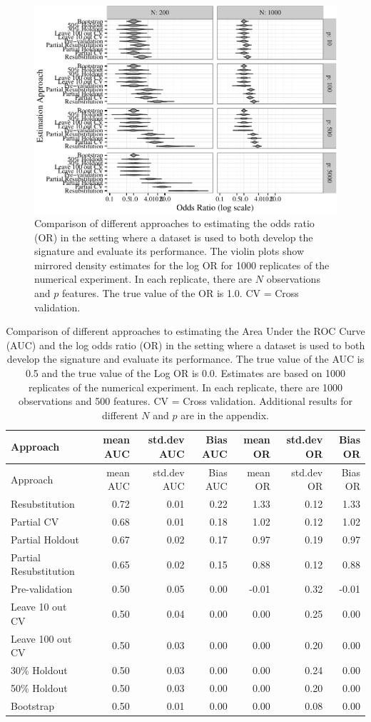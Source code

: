\documentclass[11pt,]{article}
\begin{document}
\begin{figure}[htbp]
\centering
\includegraphics{paper-revised-resub_files/figure-latex/cvsims2-1.pdf}
\caption{Comparison of different approaches to estimating the odds ratio
(OR) in the setting where a dataset is used to both develop the
signature and evaluate its performance. The violin plots show mirrored
density estimates for the log OR for 1000 replicates of the numerical
experiment. In each replicate, there are \(N\) observations and \(p\)
features. The true value of the OR is 1.0. CV = Cross validation.
\label{fig2}}
\end{figure}

\begin{longtable}[c]{@{}lrrrrrr@{}}
\caption{Comparison of different approaches to estimating the Area Under
the ROC Curve (AUC) and the log odds ratio (OR) in the setting where a
dataset is used to both develop the signature and evaluate its
performance. The true value of the AUC is 0.5 and the true value of the
Log OR is 0.0. Estimates are based on 1000 replicates of the numerical
experiment. In each replicate, there are 1000 observations and 500
features. CV = Cross validation. Additional results for different \(N\)
and \(p\) are in the appendix.}\tabularnewline
\toprule
Approach & mean AUC & std.dev AUC & Bias AUC & mean OR & std.dev OR &
Bias OR\tabularnewline
\midrule
\endfirsthead
\toprule
Approach & mean AUC & std.dev AUC & Bias AUC & mean OR & std.dev OR &
Bias OR\tabularnewline
\midrule
\endhead
Resubstitution & 0.72 & 0.01 & 0.22 & 1.33 & 0.12 & 1.33\tabularnewline
Partial CV & 0.68 & 0.01 & 0.18 & 1.02 & 0.12 & 1.02\tabularnewline
Partial Holdout & 0.67 & 0.02 & 0.17 & 0.97 & 0.19 & 0.97\tabularnewline
Partial Resubstitution & 0.65 & 0.02 & 0.15 & 0.88 & 0.12 &
0.88\tabularnewline
Pre-validation & 0.50 & 0.05 & 0.00 & -0.01 & 0.32 &
-0.01\tabularnewline
Leave 10 out CV & 0.50 & 0.04 & 0.00 & 0.00 & 0.25 & 0.00\tabularnewline
Leave 100 out CV & 0.50 & 0.03 & 0.00 & 0.00 & 0.20 &
0.00\tabularnewline
30\% Holdout & 0.50 & 0.03 & 0.00 & 0.00 & 0.24 & 0.00\tabularnewline
50\% Holdout & 0.50 & 0.03 & 0.00 & 0.00 & 0.20 & 0.00\tabularnewline
Bootstrap & 0.50 & 0.01 & 0.00 & 0.00 & 0.08 & 0.00\tabularnewline
\bottomrule
\end{longtable}
\end{document}
